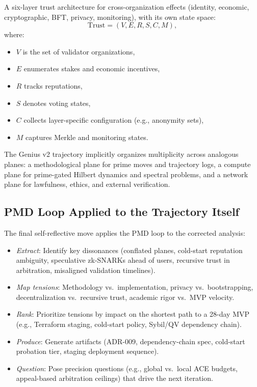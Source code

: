 \documentclass[11pt]{article}
\begin{document}
\begin{enumerate}[leftmargin=*]
  A six-layer trust architecture for cross-organization effects (identity, economic, cryptographic, BFT, privacy, monitoring), with its own state space:
  \[
  \mathrm{Trust} = (V, E, R, S, C, M),
  \]
  where:
  \begin{itemize}
    \item \(V\) is the set of validator organizations,
    \item \(E\) enumerates stakes and economic incentives,
    \item \(R\) tracks reputations,
    \item \(S\) denotes voting states,
    \item \(C\) collects layer-specific configuration (e.g., anonymity sets),
    \item \(M\) captures Merkle and monitoring states.
  \end{itemize}
\end{enumerate}

The Genius v2 trajectory implicitly organizes multiplicity across analogous planes: a methodological plane for prime moves and trajectory logs, a compute plane for prime-gated Hilbert dynamics and spectral problems, and a network plane for lawfulness, ethics, and external verification.

\subsection{PMD Loop Applied to the Trajectory Itself}

The final self-reflective move applies the PMD loop to the corrected analysis:

\begin{itemize}[leftmargin=*]
  \item \emph{Extract}: Identify key dissonances (conflated planes, cold-start reputation ambiguity, speculative zk-SNARKs ahead of users, recursive trust in arbitration, misaligned validation timelines).
  \item \emph{Map tensions}: Methodology vs.\ implementation, privacy vs.\ bootstrapping, decentralization vs.\ recursive trust, academic rigor vs.\ MVP velocity.
  \item \emph{Rank}: Prioritize tensions by impact on the shortest path to a 28-day MVP (e.g., Terraform staging, cold-start policy, Sybil/QV dependency chain).
  \item \emph{Produce}: Generate artifacts (ADR-009, dependency-chain spec, cold-start probation tier, staging deployment sequence).
  \item \emph{Question}: Pose precision questions (e.g., global vs.\ local ACE budgets, appeal-based arbitration ceilings) that drive the next iteration.
\end{itemize}
\end{document}
